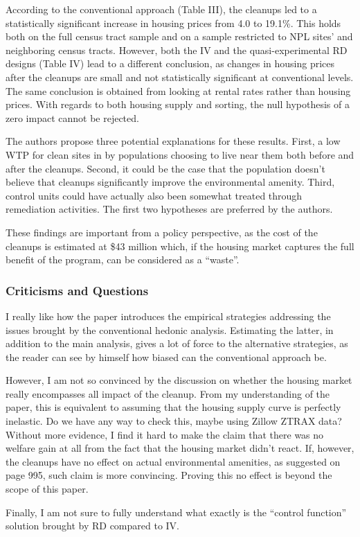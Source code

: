 \documentclass[12pt, final]{article}
\begin{document}
According to the conventional approach (Table III), the cleanups led to a statistically significant increase in housing prices from 4.0 to 19.1\%. This holds both on the full census tract sample and on a sample restricted to NPL sites’ and neighboring census tracts. However, both the IV and the quasi-experimental RD designs (Table IV) lead to a different conclusion, as changes in housing prices after the cleanups are small and not statistically significant at conventional levels. The same conclusion is obtained from looking at rental rates rather than housing prices. With regards to both housing supply and sorting, the null hypothesis of a zero impact cannot be rejected. 

The authors propose three potential explanations for these results. First, a low WTP for clean sites in by populations choosing to live near them both before and after the cleanups. Second, it could be the case that the population doesn’t believe that cleanups significantly improve the environmental amenity. Third, control units could have actually also been somewhat treated through remediation activities. The first two hypotheses are preferred by the authors.

These findings are important from a policy perspective, as the cost of the cleanups is estimated at \$43 million which, if the housing market captures the full benefit of the program, can be considered as a “waste”.



\subsubsection*{Criticisms and Questions} %
\label{ssub:criticisms_and_questions}

I really like how the paper introduces the empirical strategies addressing the issues brought by the conventional hedonic analysis. Estimating the latter, in addition to the main analysis, gives a lot of force to the alternative strategies, as the reader can see by himself how biased can the conventional approach be.

However, I am not so convinced by the discussion on whether the housing market really encompasses all impact of the cleanup. From my understanding of the paper, this is equivalent to assuming that the housing supply curve is perfectly inelastic. Do we have any way to check this, maybe using Zillow ZTRAX data? 
Without more evidence, I find it hard to make the claim that there was no welfare gain at all from the fact that the housing market didn't react. If, however, the cleanups have no effect on actual environmental amenities, as suggested on page 995, such claim is more convincing. Proving this no effect is beyond the scope of this paper.

Finally, I am not sure to fully understand what exactly is the “control function” solution brought by RD compared to IV.



\newpage
\end{document}

